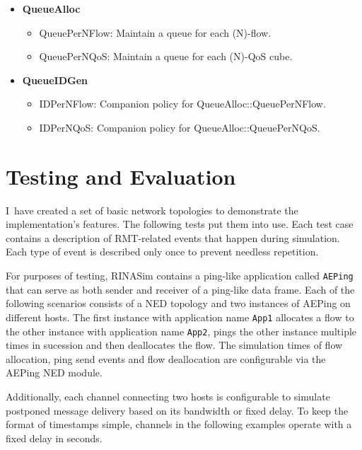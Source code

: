        \begin{itemize}
            \item \textbf{QueueAlloc}
            \begin{itemize}
                \item QueuePerNFlow: Maintain a queue for each (N)-flow.
                \item QueuePerNQoS: Maintain a queue for each (N)-QoS cube.
            \end{itemize}
            \item \textbf{QueueIDGen}
            \begin{itemize}
                \item IDPerNFlow: Companion policy for QueueAlloc::QueuePerNFlow.
                \item IDPerNQoS: Companion policy for QueueAlloc::QueuePerNQoS.
            \end{itemize}
        \end{itemize}


\chapter{Testing and Evaluation}\label{testing}

    I~have created a set of basic network topologies to demonstrate the implementation's features. The following tests put them into use.
    Each test case contains a description of RMT-related events that happen during simulation. Each type of event is described only once to prevent needless repetition.

    For purposes of testing, RINASim contains a ping-like application called \texttt{AEPing} that can serve as both sender and receiver of a ping-like data frame. Each of the following scenarios consists of a NED topology and two instances of AEPing on different hosts. The first instance with application name \texttt{App1} allocates a flow to the other instance with application name \texttt{App2}, pings the other instance multiple times in sucession and then deallocates the flow. The simulation times of flow allocation, ping send events and flow deallocation are configurable via the AEPing NED module.

    Additionally, each channel connecting two hosts is configurable to simulate postponed message delivery based on its bandwidth or fixed delay. To keep the format of timestamps simple, channels in the following examples operate with a fixed delay in seconds.

